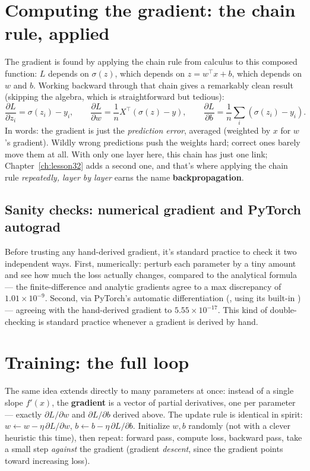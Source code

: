 \section{Computing the gradient: the chain rule, applied}

The gradient is found by applying the chain rule from calculus to this composed function: $L$ depends on $\sigma(z)$, which depends on $z=w^\top x+b$, which depends on $w$ and $b$. Working backward through that chain gives a remarkably clean result (skipping the algebra, which is straightforward but tedious):
\begin{equation}
\frac{\partial L}{\partial z_i} = \sigma(z_i) - y_i, \qquad \frac{\partial L}{\partial w} = \frac{1}{n}X^\top(\sigma(z)-y), \qquad \frac{\partial L}{\partial b} = \frac{1}{n}\sum_i(\sigma(z_i)-y_i).
\end{equation}
In words: the gradient is just the \emph{prediction error}, averaged (weighted by $x$ for $w$'s gradient). Wildly wrong predictions push the weights hard; correct ones barely move them at all. With only one layer here, this chain has just one link; Chapter~\ref{ch:lesson32} adds a second one, and that's where applying the chain rule \emph{repeatedly, layer by layer} earns the name \textbf{backpropagation}.

\subsection*{Sanity checks: numerical gradient and PyTorch autograd}

Before trusting any hand-derived gradient, it's standard practice to check it two independent ways. First, numerically: perturb each parameter by a tiny amount and see how much the loss actually changes, compared to the analytical formula --- the finite-difference and analytic gradients agree to a max discrepancy of $1.01\times10^{-9}$. Second, via PyTorch's automatic differentiation (, using its built-in ) --- agreeing with the hand-derived gradient to $5.55\times10^{-17}$. This kind of double-checking is standard practice whenever a gradient is derived by hand.

\section{Training: the full loop}

The same idea extends directly to many parameters at once: instead of a single slope $f'(x)$, the \textbf{gradient} is a vector of partial derivatives, one per parameter --- exactly $\partial L/\partial w$ and $\partial L/\partial b$ derived above. The update rule is identical in spirit: $w \leftarrow w - \eta\,\partial L/\partial w$, $b \leftarrow b - \eta\,\partial L/\partial b$. Initialize $w,b$ randomly (not with a clever heuristic this time), then repeat: forward pass, compute loss, backward pass, take a small step \emph{against} the gradient (gradient \emph{descent}, since the gradient points toward increasing loss).

